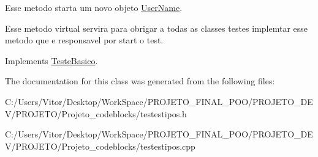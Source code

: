 Esse metodo starta um novo objeto \hyperlink{class_user_name}{User\-Name}. 

Esse metodo virtual servira para obrigar a todas as classes testes implemtar esse metodo que e responsavel por start o test. 

Implements \hyperlink{class_teste_basico_a9801730ac8a0acc39a901a179aa91e97}{Teste\-Basico}.



The documentation for this class was generated from the following files\-:\begin{DoxyCompactItemize}
\item 
C\-:/\-Users/\-Vitor/\-Desktop/\-Work\-Space/\-P\-R\-O\-J\-E\-T\-O\-\_\-\-F\-I\-N\-A\-L\-\_\-\-P\-O\-O/\-P\-R\-O\-J\-E\-T\-O\-\_\-\-D\-E\-V/\-P\-R\-O\-J\-E\-T\-O/\-Projeto\-\_\-codeblocks/testestipos.\-h\item 
C\-:/\-Users/\-Vitor/\-Desktop/\-Work\-Space/\-P\-R\-O\-J\-E\-T\-O\-\_\-\-F\-I\-N\-A\-L\-\_\-\-P\-O\-O/\-P\-R\-O\-J\-E\-T\-O\-\_\-\-D\-E\-V/\-P\-R\-O\-J\-E\-T\-O/\-Projeto\-\_\-codeblocks/testestipos.\-cpp\end{DoxyCompactItemize}
